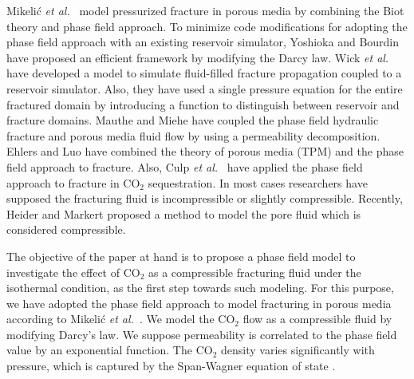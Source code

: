 Mikeli\'{c} \emph{et al.}~\cite{mikelic2014phase} model pressurized fracture in porous media by  combining the Biot theory and phase field approach. 
To minimize code modifications for adopting the phase field approach with an existing reservoir simulator, Yoshioka and Bourdin \cite{yoshioka2016variational}  have proposed an efficient framework by modifying the Darcy law.
Wick \emph{et al.}~\cite{wick2016fluid} have developed a model to simulate fluid-filled fracture propagation coupled to a reservoir simulator. Also, they have  used a single pressure equation for the entire fractured domain by introducing a function to distinguish between reservoir and fracture domains. Mauthe  and 
Miehe \cite{mauthe2017hydraulic} have coupled the phase field hydraulic fracture and porous media fluid flow by using a permeability decomposition. 
Ehlers and Luo \cite{ehlers2017phase} have combined the theory of porous media (TPM)  and the phase field approach to fracture.  Also, Culp \emph{et al.}~\cite{culp2017phase} have applied the phase field approach to fracture in CO$_2$ sequestration. %
In most cases researchers have supposed the fracturing fluid is incompressible or slightly compressible.
Recently, Heider and Markert \cite{heider2017modelling} proposed a method to model the pore fluid which is considered compressible. %

The objective of the paper at hand is to propose a phase field model to investigate the effect of CO$_2$ as a compressible fracturing fluid under the isothermal condition, as the first step towards such modeling. For this purpose, we have adopted the phase field approach to model fracturing in porous media according to Mikeli\'{c} \emph{et al.}~\cite{mikelic2014phase}. We model the CO$_2$ flow as a compressible fluid by modifying Darcy's law. We suppose permeability is correlated to the phase field value by an exponential function. The CO$_2$ density varies significantly with pressure, which is captured by the Span-Wagner equation of state \cite{span1996new}.


